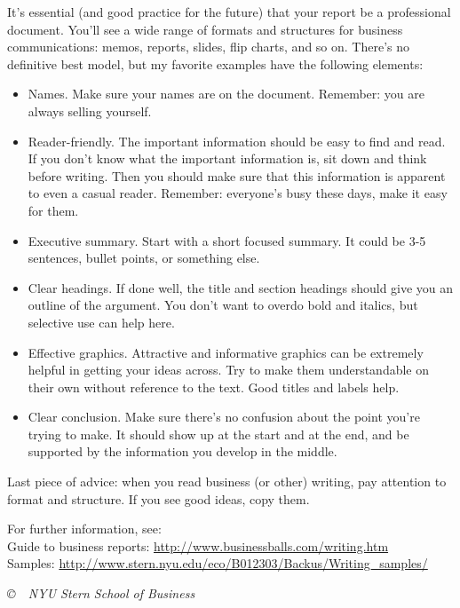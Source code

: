 \documentclass[letterpaper,12pt]{article}
\begin{document}
It's essential (and good practice for the future) 
that your report be a professional document.  
You'll see a wide range of formats and structures 
for business communications:
memos, reports, slides, flip charts, and so on.
There's no definitive best model,
but my favorite examples have the following elements:  
%
\begin{itemize}
\item Names.  
Make sure your names are on the document.  
Remember:  you are always selling yourself.  

\item Reader-friendly.  
The important information should be easy to find and read.  
If you don't know what the important information is, 
sit down and think before writing. 
Then you should make sure that this information is 
apparent to even a casual reader.
Remember:  everyone's busy these days, make it easy for them.  

\item Executive summary.  Start with a short focused summary.  
It could be 3-5 sentences, bullet points, or something else.  
    
\item Clear headings.  
If done well, the title and section headings should 
give you an outline of the argument.  
You don't want to overdo bold and italics, 
but selective use can help here.  

\item Effective graphics.  Attractive and informative graphics 
can be extremely helpful in getting your ideas across.
Try to make them understandable
on their own without reference to the text.  
Good titles and labels help.  

\item Clear conclusion.  Make sure there's no confusion 
about the point you're trying to make.
It should show up at the start and at the end, 
and be supported by the information you develop in the middle. 

\end{itemize}
%
Last piece of advice:  when you read business (or other) writing, 
pay attention to format and structure.  
If you see good ideas, copy them.  

For further information, see:   \\ 
Guide to business reports:  \url{http://www.businessballs.com/writing.htm} \\
Samples:  \url{http://www.stern.nyu.edu/eco/B012303/Backus/Writing_samples/}


\vfill \centerline{\it \copyright \ \number\year \ NYU Stern
School of Business}
\end{document}
